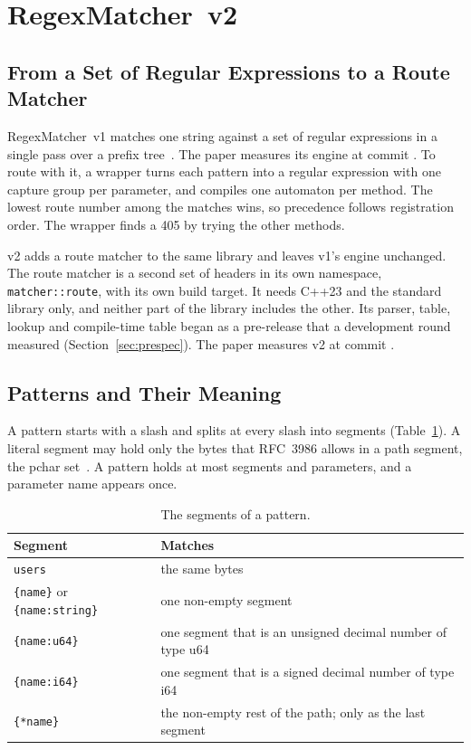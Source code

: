 \section{RegexMatcher~v2}\label{sec:design}

\subsection{From a Set of Regular Expressions to a Route Matcher}

RegexMatcher~v1 matches one string against a set of regular expressions in a single pass over a
prefix tree~\cite{stankov2024regex,regexmatcher2026v1}. The paper measures its engine at commit
\RegexMatcherVOneCommit. To route with it, a wrapper turns each pattern into a regular expression
with one capture group per parameter, and compiles one automaton per method. The lowest route
number among the matches wins, so precedence follows registration order. The wrapper finds a 405
by trying the other methods.

v2 adds a route matcher to the same library and leaves v1's engine unchanged. The route matcher is a
second set of headers in its own namespace, \texttt{matcher::route}, with its own build target. It
needs C++23 and the standard library only, and neither part of the library includes the other. Its
parser, table, lookup and compile-time table began as a pre-release that a development round
measured (Section~\ref{sec:prespec}). The paper measures v2 at commit \RegexMatcherCommit.

\subsection{Patterns and Their Meaning}\label{sec:semantics}

A pattern starts with a slash and splits at every slash into segments (Table~\ref{tab:segments}). A
literal segment may hold only the bytes that RFC~3986 allows in a path segment, the pchar
set~\cite{bernerslee2005rfc3986}. A pattern holds at most \VTwoMaxSegments{} segments and
\VTwoMaxParams{} parameters, and a parameter name appears once.

\begin{table}[H]
\caption{The segments of a pattern.\label{tab:segments}}
\centering\small
\begin{tabular}{@{}ll@{}}
\toprule
\textbf{Segment} & \textbf{Matches} \\
\midrule
\texttt{users} & the same bytes \\
\texttt{\{name\}} or \texttt{\{name:string\}} & one non-empty segment \\
\texttt{\{name:u64\}} & one segment that is an unsigned decimal number of type u64 \\
\texttt{\{name:i64\}} & one segment that is a signed decimal number of type i64 \\
\texttt{\{*name\}} & the non-empty rest of the path; only as the last segment \\
\bottomrule
\end{tabular}
\end{table}

